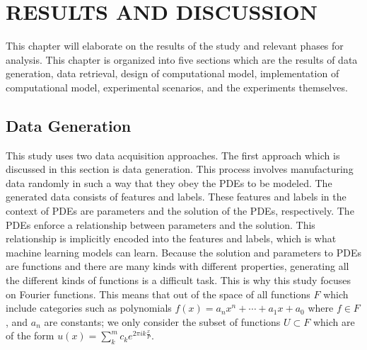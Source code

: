 \chapter{RESULTS AND DISCUSSION}
\noindent This chapter will elaborate on the results of the study and relevant phases for analysis. This chapter is organized into five sections which are the results of data generation, data retrieval, design of computational model, implementation of computational model, experimental scenarios, and the experiments themselves.

\section{Data Generation}\label{sec:data_generation}
\noindent This study uses two data acquisition approaches. The first approach which is discussed in this section is data generation. This process involves manufacturing data randomly in such a way that they obey the PDEs to be modeled. The generated data consists of features and labels. These features and labels in the context of PDEs are parameters and the solution of the PDEs, respectively. The PDEs enforce a relationship between parameters and the solution. This relationship is implicitly encoded into the features and labels, which is what machine learning models can learn. Because the solution and parameters to PDEs are functions and there are many kinds with different properties, generating all the different kinds of functions is a difficult task. This is why this study focuses on Fourier functions. This means that out of the space of all functions \(F \) which include categories such as polynomials \(f\left(x\right)=a_{n}x^n+\cdots+a_1x+a_0\) where \(f\in F\), and \(a_n\) are constants; we only consider the subset of functions \(U \subset F\) which are of the form \(u\left(x\right)=\sum_{k}^{m}c_k e^{2\pi i k \frac{x}{P}}\).


